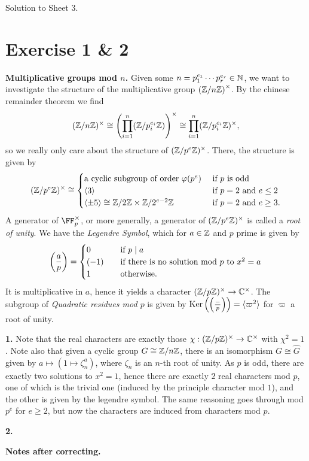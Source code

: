 \documentclass[a4paper,11pt]{article}
\begin{document}
\begin{center}
    \huge{ Solution to Sheet 3. }
\end{center}

\section*{Exercise 1 \& 2}
\textbf{Multiplicative groups mod $n$.} Given some $n = p_1^{e_1} \cdots
p_r^{e_r} \in \mathbb{N}$, we want to investigate the structure of the multiplicative group
$\left ( \mathbb{Z}/n\mathbb{Z} \right )^\times$. By the chinese remainder theorem we find 
\[
    (\mathbb{Z} / n\mathbb{Z})^\times \cong \left ( \prod_{i = 1}^n (\mathbb{Z} / p_i^{e_i}\mathbb{Z}) \right
        )^\times \cong \prod_{i = 1}^n (\mathbb{Z} / p_i^{e_i}\mathbb{Z})^\times,
\]
so we really only care about the structure of $(\mathbb{Z}/p^e\mathbb{Z})^\times$. There, the 
structure is given by
\[
    (\mathbb{Z}/p^e\mathbb{Z})^\times \cong 
    \begin{cases} 
        \text{a cyclic subgroup of order $\varphi(p^e)$} & \text{ if $p$ is odd} \\
        \langle 3 \rangle & \text{ if $p=2$ and $e \leq 2$} \\
        \langle \pm 5 \rangle \cong \mathbb{Z}/2\mathbb{Z} \times \mathbb{Z}/2^{e-2}\mathbb{Z} & \text{ if
        $p=2$ and $e \geq 3$.} 
    \end{cases}
\]
A generator of $\FF_p^\times$, or more generally, a generator of $(\mathbb{Z}/p^e\mathbb{Z})^\times$
is called a \textit{root of unity}.
We have the \textit{Legendre Symbol}, which for $a \in \mathbb{Z}$ and $p$ prime is given by 
\[
    \left( \frac{a}{p} \right) = 
    \begin{cases}
        0 \quad & \text{if } p \mid a\\
        (-1) \quad & \text{if there is no solution mod $p$ to }  x^2 = a\\
        1 \quad & \text{otherwise.}\\
    \end{cases}
\]
It is multiplicative in $a$, hence it yields a character $(\mathbb{Z}/p\mathbb{Z})^\times \to
\mathbb{C}^\times$. The subgroup of \textit{Quadratic residues mod $p$} is given by
$\operatorname{Ker} \left( \left( \frac{-}{p} \right) \right) = \langle \varpi^2 \rangle$ for $\varpi$ a
root of unity.

\textbf{1.} Note that the real characters are exactly those $\chi:
(\mathbb{Z}/p\mathbb{Z})^\times \to \mathbb{C}^\times$  with $\chi^2 = 1$. Note also that given a cyclic 
group $G \cong \mathbb{Z}/n\mathbb{Z}$, there is an isomorphism $G \cong \hat G$ given by 
$a \mapsto (1 \mapsto \zeta_n^a)$, where $\zeta_n$ is an $n$-th root of unity. 
As $p$ is odd, there are exactly two solutions to $x^2=1$, hence there are exactly
$2$ real characters mod $p$, one of which is the trivial
one (induced by the principle character mod $1$), and the other is given by the 
legendre symbol. The same reasoning goes through mod $p^e$ for $e \geq 2$, but now
the characters are induced from characters mod $p$. 

\textbf{2.}

\textbf{Notes after correcting.} \leavevmode
\end{document}
